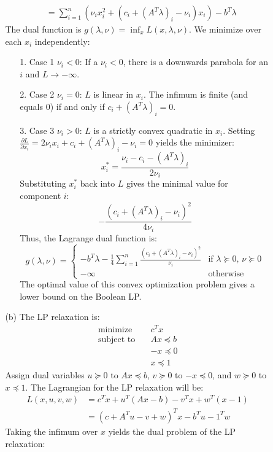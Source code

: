 \documentclass{article}
\begin{document}
\begin{itemize}
\begin{itemize}
\begin{itemize}
\begin{align*}
        &= \sum_{i=1}^n \left( \nu_i x_i^2 + (c_i + (A^T \lambda)_i - \nu_i) x_i \right) - b^T \lambda
      \end{align*}
      The dual function is $g(\lambda, \nu) = \inf_x L(x, \lambda, \nu)$. We minimize over each $x_i$ independently:
      \begin{itemize}
        \item[1.] Case 1 $\nu_i < 0$: If a $\nu_i < 0$, there is a downwards parabola for an $i$ and $L \to -\infty$.
        \item[2.] Case 2 $\nu_i = 0$: $L$ is linear in $x_i$. The infimum is finite (and equals $0$) if and only if $c_i + (A^T \lambda)_i = 0$.
        \item[3.] Case 3 $\nu_i > 0$: $L$ is a strictly convex quadratic in $x_i$. Setting $\frac{\partial L}{\partial x_i} = 2\nu_i x_i + c_i + (A^T \lambda)_i - \nu_i = 0$ yields the minimizer:
        \[ x_i^* = \frac{\nu_i - c_i - (A^T \lambda)_i}{2\nu_i} \]
        Substituting $x_i^*$ back into $L$ gives the minimal value for component $i$:
        \[ -\frac{(c_i + (A^T \lambda)_i - \nu_i)^2}{4\nu_i} \]
        Thus, the Lagrange dual function is:
        \[ g(\lambda, \nu) = \begin{cases} -b^T \lambda - \displaystyle\frac{1}{4} \sum_{i=1}^n \frac{(c_i + (A^T \lambda)_i - \nu_i)^2}{\nu_i} & \text{if } \lambda \succeq 0, \, \nu \succeq 0 \\ -\infty & \text{otherwise} \end{cases} \]
        The optimal value of this convex optimization problem gives a lower bound on the Boolean LP.
      \end{itemize}
      \item[(b)] The LP relaxation is:
      \[ \begin{aligned} \text{minimize} \quad & c^T x \\ \text{subject to} \quad & Ax \preceq b \\ & -x \preceq 0 \\ & x \preceq 1 \end{aligned} \]
      Assign dual variables $u \succeq 0$ to $Ax \preceq b$, $v \succeq 0$ to $-x \preceq 0$, and $w \succeq 0$ to $x \preceq 1$. The Lagrangian for the LP relaxation will be:
      \begin{align*}
        L(x, u, v, w) &= c^T x + u^T(Ax - b) - v^T x + w^T(x - 1) \\
        &= (c + A^T u - v + w)^T x - b^T u - 1^T w
      \end{align*}
      Taking the infimum over $x$ yields the dual problem of the LP relaxation:

\end{itemize}
\end{itemize}
\end{itemize}
\end{document}
